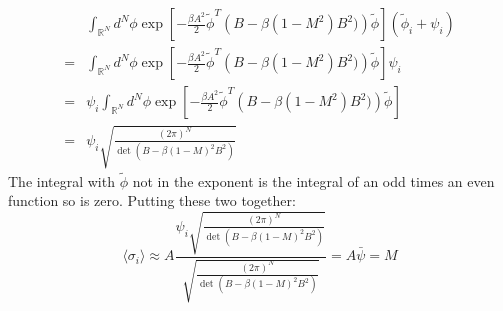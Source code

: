 \documentclass[12pt,a4]{article}
\begin{document}
\begin{enumerate}
\begin{enumerate}
\begin{align*}
            &\int_{\mathbb{R}^N} d^N\phi \exp\left[-\frac{\beta A^2}{2}\tilde\phi^T\left(B  - \beta (1 - M^2)B^2)\right) \tilde\phi \right] (\tilde \phi_i + \psi_i)\\
          = & \int_{\mathbb{R}^N} d^N\phi \exp\left[-\frac{\beta A^2}{2}\tilde\phi^T\left(B  - \beta (1 - M^2)B^2)\right) \tilde\phi \right]\psi_i\\
          = & \psi_i\int_{\mathbb{R}^N} d^N\phi \exp\left[-\frac{\beta A^2}{2}\tilde\phi^T\left(B  - \beta (1 - M^2)B^2)\right) \tilde\phi \right]\\
          = & \psi_i \sqrt{\frac{(2 \pi)^N}{\det\left( B  - \beta (1 - M)^2B^2\right)}}
        \end{align*}
        The integral with $\tilde \phi$ not in the exponent is the integral of an odd times an even function so is zero.
        Putting these two together:
        \begin{equation*}
          \langle \sigma_i \rangle \approx A \frac{\psi_i \sqrt{\frac{(2 \pi)^N}{\det\left( B  - \beta (1 - M)^2B^2\right)}}}{\sqrt{\frac{(2 \pi)^N}{\det\left( B  - \beta (1 - M)^2B^2\right)}}} = A \bar{\psi} = M
        \end{equation*}
    \end{enumerate}
\end{enumerate}
\end{document}
